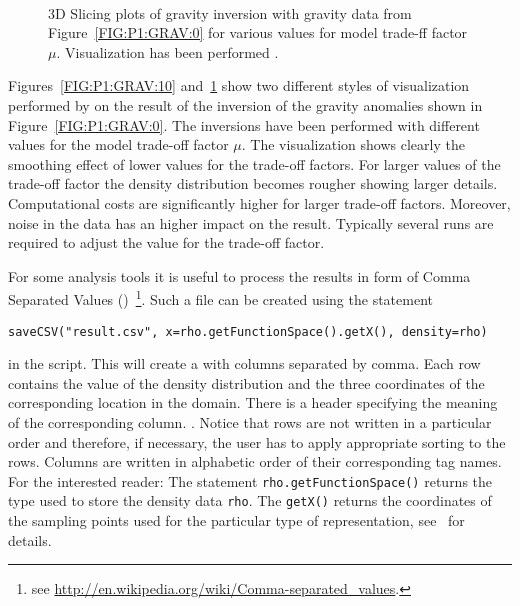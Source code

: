 \begin{figure}
	     \begin{center}
	        \\ %
	    \end{center}
	   \label{FIG:P1:GRAV:11}

\caption{3D Slicing plots of gravity inversion with gravity data from Figure~\ref{FIG:P1:GRAV:0} for
various values for model trade-ff factor $\mu$. Visualization has been performed \VisIt. }
\end{figure}

Figures~\ref{FIG:P1:GRAV:10} and~\ref{FIG:P1:GRAV:11} show two different styles of visualization performed by \VisIt
on the result of the inversion of the gravity anomalies shown in Figure~\ref{FIG:P1:GRAV:0}. The inversions
have been performed with different values for the  model trade-off factor $\mu$. The visualization shows 
clearly the smoothing effect of lower values for the trade-off factors. For larger values of the trade-off factor
the density distribution becomes rougher showing larger details. Computational costs are significantly higher 
for larger trade-off factors. Moreover, noise in the data has an higher impact on the result. Typically several 
runs are required to adjust the value for the trade-off factor.


For some analysis tools it is useful to process the results in form of Comma Separated Values (\CSV)~\footnote{see 
\url{http://en.wikipedia.org/wiki/Comma-separated_values}.}. Such a file can be created using the statement
\begin{verbatim}
saveCSV("result.csv", x=rho.getFunctionSpace().getX(), density=rho)
\end{verbatim}
in the script. This will create a  with columns separated by comma. Each row contains the value of the
density distribution and the three coordinates of the corresponding location in the domain. There is a header specifying 
the meaning of the corresponding column. . Notice that rows are not written in a particular 
order and therefore, if necessary, the user has to apply appropriate sorting to the rows.
Columns are written in alphabetic order of their corresponding tag names. For the interested reader: The 
statement \verb|rho.getFunctionSpace()| returns the type used to store the density data \verb|rho|.
The  \verb|getX()| returns the coordinates of the sampling points used for the particular type of
representation, see~\cite{ESCRIPT} for details. 


